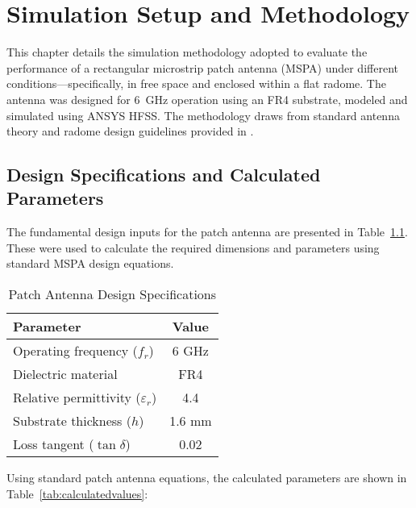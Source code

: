 \chapter{Simulation Setup and Methodology}

This chapter details the simulation methodology adopted to evaluate the performance of a rectangular microstrip patch antenna (MSPA) under different conditions—specifically, in free space and enclosed within a flat radome. The antenna was designed for 6~GHz operation using an FR4 substrate, modeled and simulated using ANSYS HFSS. The methodology draws from standard antenna theory \cite{balanis} and radome design guidelines provided in \cite{swra705}.

\section{Design Specifications and Calculated Parameters}

The fundamental design inputs for the patch antenna are presented in Table~\ref{tab:designspecs}. These were used to calculate the required dimensions and parameters using standard MSPA design equations.

\begin{table}[htbp]
\centering
\caption{Patch Antenna Design Specifications}
\begin{tabular}{lc}
\toprule
\textbf{Parameter} & \textbf{Value} \\
\midrule
Operating frequency ($f_r$) & 6 GHz \\
Dielectric material & FR4 \\
Relative permittivity ($\varepsilon_r$) & 4.4 \\
Substrate thickness ($h$) & 1.6 mm \\
Loss tangent ($\tan \delta$) & 0.02 \\
\bottomrule
\end{tabular}
\label{tab:designspecs}
\end{table}

Using standard patch antenna equations, the calculated parameters are shown in Table~\ref{tab:calculatedvalues}:


